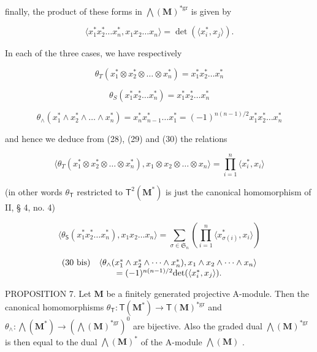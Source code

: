 finally, the product of these forms in \(\bigwedge (\mathbf{M})^{*\mathrm{gr}}\) is given by

\[
\langle x _ {1} ^ {*} x _ {2} ^ {*} \dots x _ {n} ^ {*}, x _ {1} x _ {2} \dots x _ {n} \rangle = \det (\langle x _ {i} ^ {*}, x _ {j} \rangle).\tag{30}
\]

In each of the three cases, we have respectively

\[
\theta_ {T} (x _ {1} ^ {*} \otimes x _ {2} ^ {*} \otimes \dots \otimes x _ {n} ^ {*}) = x _ {1} ^ {*} x _ {2} ^ {*} \dots x _ {n} ^ {*}
\]

\[
\theta_ {S} (x _ {1} ^ {*} x _ {2} ^ {*} \dots x _ {n} ^ {*}) = x _ {1} ^ {*} x _ {2} ^ {*} \dots x _ {n} ^ {*}
\]

\[
\theta_ {\wedge} (x _ {1} ^ {*} \wedge x _ {2} ^ {*} \wedge \dots \wedge x _ {n} ^ {*}) = x _ {n} ^ {*} x _ {n - 1} ^ {*} \dots x _ {1} ^ {*} = (- 1) ^ {n (n - 1) / 2} x _ {1} ^ {*} x _ {2} ^ {*} \dots x _ {n} ^ {*}
\]

and hence we deduce from (28), (29) and (30) the relations

\[
\langle \theta_ {T} (x _ {1} ^ {*} \otimes x _ {2} ^ {*} \otimes \dots \otimes x _ {n} ^ {*}), x _ {1} \otimes x _ {2} \otimes \dots \otimes x _ {n} \rangle = \prod_ {i = 1} ^ {n} \langle x _ {i} ^ {*}, x _ {i} \rangle\tag{28 bis}
\]

(in other words \(\theta_{\mathsf{T}}\) restricted to \(\mathsf{T}^2 (\mathbf{M}^*)\) is just the canonical homomorphism of II, § 4, no. 4)

\[
\langle \theta_ {\mathsf {S}} (x _ {1} ^ {*} x _ {2} ^ {*} \dots x _ {n} ^ {*}), x _ {1} x _ {2} \dots x _ {n} \rangle = \sum_ {\sigma \in \mathfrak {S} _ {n}} \left(\prod_ {i = 1} ^ {n} \langle x _ {\sigma (i)} ^ {*}, x _ {i} \rangle\right)\tag{29 bis}
\]

\[
\begin{array}{r l} (30 \text { bis}) &\langle \theta_ {\wedge} (x _ {1} ^ {*} \wedge x _ {2} ^ {*} \wedge \dots \wedge x _ {n} ^ {*}), x _ {1} \wedge x _ {2} \wedge \dots \wedge x _ {n} \rangle \\ & \qquad = (- 1) ^ {n (n - 1) / 2} \mathrm{det} (\langle x _ {i} ^ {*}, x _ {j} \rangle). \end{array}
\]

PROPOSITION 7. Let \(\mathbf{M}\) be a finitely generated projective A-module. Then the canonical homomorphisms \(\theta_{\mathsf{T}}: \mathsf{T}(\mathbf{M}^{*}) \to \mathsf{T}(\mathbf{M})^{*\mathrm{gr}}\) and \(\theta_{\wedge}: \bigwedge (\mathbf{M}^{*}) \to (\bigwedge (\mathbf{M})^{*\mathrm{gr}})^{0}\) are bijective. Also the graded dual \(\bigwedge (\mathbf{M})^{*\mathrm{gr}}\) is then equal to the dual \(\bigwedge (\mathbf{M})^{*}\) of the A-module \(\bigwedge (\mathbf{M})\) .

